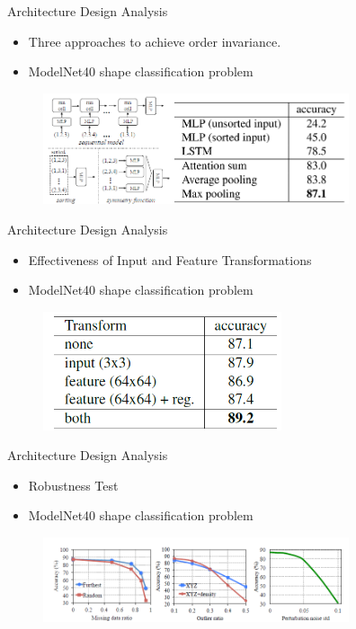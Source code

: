 \documentclass[serif,mathserif]{beamer}
\begin{document}
\begin{frame}{Architecture Design Analysis}
	\begin{itemize}
		\item Three approaches to achieve order invariance.
		\item ModelNet40 shape classification problem
	\end{itemize}
	\begin{figure}
		\includegraphics[width=9cm]{image/arch.png}
	\end{figure}
\end{frame}

\begin{frame}{Architecture Design Analysis}
	\begin{itemize}
		\item Effectiveness of Input and Feature Transformations
		\item ModelNet40 shape classification problem
	\end{itemize}
	\begin{figure}
		\includegraphics[width=7cm]{image/arch2.png}
	\end{figure}
\end{frame}

\begin{frame}{Architecture Design Analysis}
	\begin{itemize}
		\item Robustness Test
		\item ModelNet40 shape classification problem
	\end{itemize}
	\begin{figure}
		\includegraphics[width=9cm]{image/arch3.png}
	\end{figure}
\end{frame}
\end{document}

